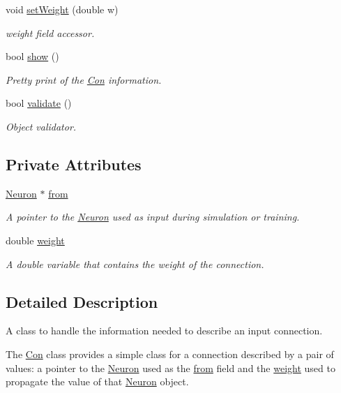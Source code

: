 \begin{DoxyCompactItemize}
void \hyperlink{class_con_aa9b30bb7eda5c5578d11a65977968d38}{setWeight} (double w)
\begin{DoxyCompactList}\small\item\em weight field accessor. \end{DoxyCompactList}\item 
bool \hyperlink{class_con_ab85838575b5e01f3b8073136f2102922}{show} ()
\begin{DoxyCompactList}\small\item\em Pretty print of the \hyperlink{class_con}{Con} information. \end{DoxyCompactList}\item 
bool \hyperlink{class_con_af5f836a7b0988b3d9113589b2959d5e6}{validate} ()
\begin{DoxyCompactList}\small\item\em Object validator. \end{DoxyCompactList}\end{DoxyCompactItemize}
\subsection*{Private Attributes}
\begin{DoxyCompactItemize}
\item 
\hyperlink{class_neuron}{Neuron} $\ast$ \hyperlink{class_con_a40215fdb25f3b2ed66e965df558e86e2}{from}
\begin{DoxyCompactList}\small\item\em A pointer to the \hyperlink{class_neuron}{Neuron} used as input during simulation or training. \end{DoxyCompactList}\item 
double \hyperlink{class_con_a7f46485ba5b41971ea38641f9e7d1be0}{weight}
\begin{DoxyCompactList}\small\item\em A double variable that contains the weight of the connection. \end{DoxyCompactList}\end{DoxyCompactItemize}


\subsection{Detailed Description}
A class to handle the information needed to describe an input connection. 

The \hyperlink{class_con}{Con} class provides a simple class for a connection described by a pair of values: a pointer to the \hyperlink{class_neuron}{Neuron} used as the \hyperlink{class_con_a40215fdb25f3b2ed66e965df558e86e2}{from} field and the \hyperlink{class_con_a7f46485ba5b41971ea38641f9e7d1be0}{weight} used to propagate the value of that \hyperlink{class_neuron}{Neuron} object. 

